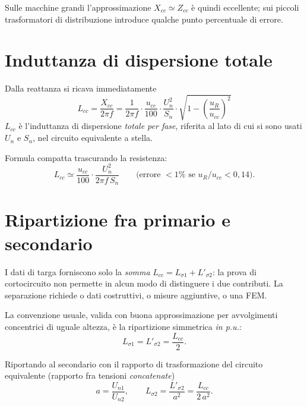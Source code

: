 \documentclass[11pt,a4paper]{article}
\begin{document}
Sulle macchine grandi l'approssimazione $X_{cc}\simeq Z_{cc}$ è quindi eccellente; sui
piccoli trasformatori di distribuzione introduce qualche punto percentuale di errore.

\section{Induttanza di dispersione totale}

Dalla reattanza si ricava immediatamente
\begin{equation}
\boxed{\;L_{cc} = \frac{X_{cc}}{2\pi f}
= \frac{1}{2\pi f}\cdot\frac{u_{cc}}{100}\cdot\frac{U_n^2}{S_n}\cdot
\sqrt{1-\left(\frac{u_R}{u_{cc}}\right)^{2}}\;}
\label{eq:Lcc}
\end{equation}
$L_{cc}$ è l'induttanza di dispersione \emph{totale per fase}, riferita al lato di cui si
sono usati $U_n$ e $S_n$, nel circuito equivalente a stella.

Formula compatta trascurando la resistenza:
\begin{equation}
L_{cc} \simeq \frac{u_{cc}}{100}\cdot\frac{U_n^2}{2\pi f\, S_n}
\qquad\text{(errore }<1\%\text{ se } u_R/u_{cc}<0{,}14\text{)}.
\end{equation}

\section{Ripartizione fra primario e secondario}

I dati di targa forniscono solo la \emph{somma} $L_{cc}=L_{\sigma 1}+L'_{\sigma 2}$: la
prova di cortocircuito non permette in alcun modo di distinguere i due contributi. La
separazione richiede o dati costruttivi, o misure aggiuntive, o una FEM.

La convenzione usuale, valida con buona approssimazione per avvolgimenti concentrici di
uguale altezza, è la ripartizione simmetrica \emph{in p.u.}:
\begin{equation}
L_{\sigma 1} = L'_{\sigma 2} = \frac{L_{cc}}{2}.
\end{equation}

Riportando al secondario con il rapporto di trasformazione del circuito equivalente
(rapporto fra tensioni \emph{concatenate})
\begin{equation}
a = \frac{U_{n1}}{U_{n2}},
\qquad
L_{\sigma 2} = \frac{L'_{\sigma 2}}{a^{2}} = \frac{L_{cc}}{2\,a^{2}} .
\end{equation}
\end{document}
